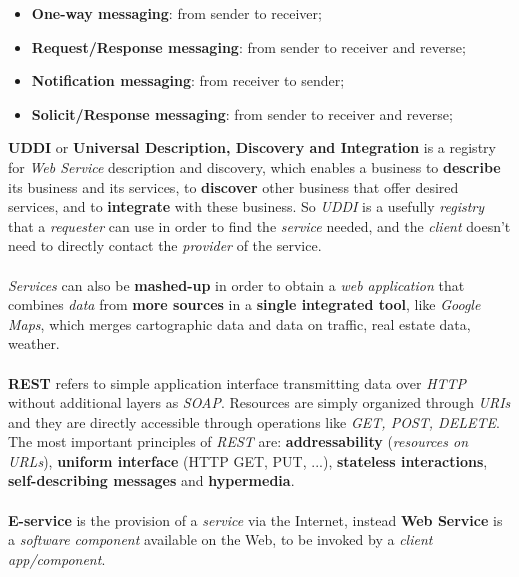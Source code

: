 \documentclass{article}
\begin{document}
\begin{itemize}
\item \textbf{One-way messaging}: from sender to receiver;
\item \textbf{Request/Response messaging}: from sender to receiver and reverse;
\item \textbf{Notification messaging}: from receiver to sender;
\item \textbf{Solicit/Response messaging}: from sender to receiver and reverse; 
\end{itemize}
\textbf{UDDI} or \textbf{Universal Description, Discovery and Integration} is a registry for \emph{Web Service} description and discovery, which enables a business to \textbf{describe} its business and its services, to \textbf{discover} other business that offer desired services, and to \textbf{integrate} with these business. So \emph{UDDI} is a usefully \emph{registry} that a \emph{requester} can use in order to find the \emph{service} needed, and the \emph{client} doesn't need to directly contact the \emph{provider} of the service.  \\\\
\emph{Services} can also be \textbf{mashed-up} in order to obtain a \emph{web application} that combines \emph{data} from \textbf{more sources} in a \textbf{single integrated tool}, like \emph{Google Maps}, which merges cartographic data and data on traffic, real estate data, weather.\\\\
\textbf{REST} refers to simple application interface transmitting data over \emph{HTTP} without additional layers as \emph{SOAP}. Resources are simply organized through \emph{URIs} and they are directly accessible through operations like \emph{GET, POST, DELETE}. The most important principles of \emph{REST} are: \textbf{addressability} (\emph{resources on URLs}), \textbf{uniform interface} (HTTP GET, PUT, ...), \textbf{stateless interactions}, \textbf{self-describing messages} and \textbf{hypermedia}.\\\\
\textbf{E-service} is the provision of a \emph{service} via the Internet, instead \textbf{Web Service} is a \emph{software component} available on the Web, to be invoked by a \emph{client app/component}.
\end{document}
